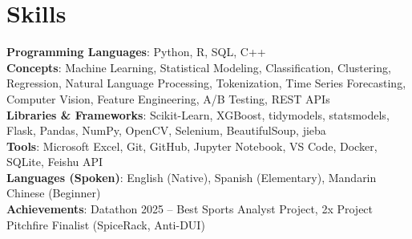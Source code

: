 \documentclass[letterpaper,10pt]{article}
\begin{document}
\section{Skills}
 \begin{itemize}[leftmargin=0.15in, label={}]
    \small{\item{
     \textbf{Programming Languages}{: Python, R, SQL, C++} \\
     \textbf{Concepts}{: Machine Learning, Statistical Modeling, Classification, Clustering, Regression, Natural Language Processing, Tokenization, Time Series Forecasting, Computer Vision, Feature Engineering, A/B Testing, REST APIs} \\
     \textbf{Libraries \& Frameworks}{: Scikit-Learn, XGBoost, tidymodels, statsmodels, Flask, Pandas, NumPy, OpenCV, Selenium, BeautifulSoup, jieba} \\
     \textbf{Tools}{: Microsoft Excel, Git, GitHub, Jupyter Notebook, VS Code, Docker, SQLite, Feishu API} \\
     \textbf{Languages (Spoken)}{: English (Native), Spanish (Elementary), Mandarin Chinese (Beginner)} \\
     \textbf{Achievements}{: Datathon 2025 -- Best Sports Analyst Project, 2x Project Pitchfire Finalist (SpiceRack, Anti-DUI)}
    }}
 \end{itemize}
 
\end{document}
